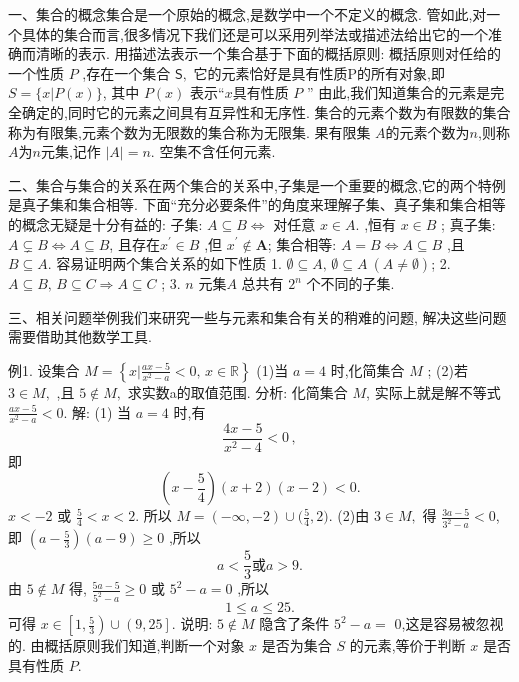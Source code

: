 
一、集合的概念集合是一个原始的概念,是数学中一个不定义的概念.
管如此,对一个具体的集合而言,很多情况下我们还是可以采用列举法或描述法给出它的一个准确而清晰的表示.
用描述法表示一个集合基于下面的概括原则:
概括原则对任给的一个性质 ${\mathbf{}}P$ ,存在一个集合 ${\mathsf{S}},$ 它的元素恰好是具有性质P的所有对象,即
$S = \{x | P(x)\}$,
其中 $\textstyle P(x)$ 表示“$x$具有性质 ${\mathbf{}}P$ ”
由此,我们知道集合的元素是完全确定的,同时它的元素之间具有互异性和无序性.
集合的元素个数为有限数的集合称为有限集,元素个数为无限数的集合称为无限集.
果有限集 $A$的元素个数为$n$,则称 $A$为$n$元集,记作 $|A|=n.$ 空集不含任何元素.



二、集合与集合的关系在两个集合的关系中,子集是一个重要的概念,它的两个特例是真子集和集合相等.
下面“充分必要条件”的角度来理解子集、真子集和集合相等的概念无疑是十分有益的:
子集: $A\subseteq B\Longleftrightarrow$ 对任意 $x\in A.$ ,恒有 $x\in B$ ;
真子集: $A\subsetneq B\Longleftrightarrow A\subseteq B$, 且存在$x^{\prime}\in B$ ,但 $x^{\prime}\not\in{\boldsymbol{A}}$;
集合相等: $A=B\Longleftrightarrow A\subseteq B$ ,且 $B\subseteq A.$ 
容易证明两个集合关系的如下性质
1. $\emptyset \subseteq A,\,\emptyset\subseteq A\ (A\neq\emptyset)$;
2. $A\subseteq B,\,B\subseteq C\Rightarrow A\subseteq C$ ;
3. $n$ 元集$A$ 总共有 $2^n$ 个不同的子集.



三、相关问题举例我们来研究一些与元素和集合有关的稍难的问题, 解决这些问题需要借助其他数学工具.



例1. 设集合 $M=\left\{x |{\frac{a x-5}{x^{2}-a}}<0,\,x\in\mathbb{R}\right\}$ 
(1)当 $a=4$ 时,化简集合 $M$ ;
(2)若 $3\in M,$ ,且 $5\notin M,$ 求实数a的取值范围.
分析: 化简集合 $M$, 实际上就是解不等式 ${\frac{a x-5}{x^{2}-a}}<0.$ 
解: (1) 当 $a=4$ 时,有
$$
{\frac{4x-5}{x^{2}-4}}<0\,, 
$$
即
$$
\left(x-\frac{5}{4}\right)(x+2)(x-2)<0. 
$$
$x<-2$ 或 ${\frac{5}{4}}<x<2.$ 
所以 $M=(-\infty,-2)\cup\bigl({\frac{5}{4}}, 2\bigr).$ 
(2)由 $3\in M,$ 得 ${\frac{3a-5}{3^{2}-a}}<0$,即 $\left(a-\frac{5}{3}\right)(a-9)\geqslant0$ ,所以
$$
a<{\frac{5}{3}}或a>9. 
$$
由 $5\notin M$ 得, ${\frac{5a-5}{5^{2}-a}}\geqslant0$ 或 $5^{2}-a=0$ ,所以
$$
1\leq a\leq25. 
$$
可得 $x\in\left[1,{\frac{5}{3}}\right)\cup\left(9,25\right]$.
说明: $5\notin M$ 隐含了条件 $5^{2}-a=$ 0,这是容易被忽视的.
由概括原则我们知道,判断一个对象 $x$ 是否为集合 $S$ 的元素,等价于判断 $x$ 是否具有性质 $P$. 



